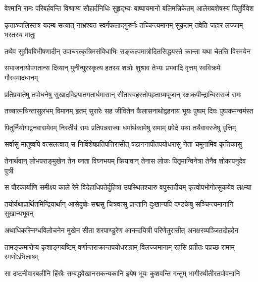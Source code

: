 \fourlineindentedshloka
{वेश्मानि रामः परिबर्हवन्ति}
{विश्राण्य सौहार्दनिधिः सुहृद्भ्यः}
{बाष्पायमानो बलिमन्निकेतम्}
{आलेख्यशेषस्य पितुर्विवेश} %

\fourlineindentedshloka
{कृताञ्जलिस्तत्र यदम्ब सत्यात्}
{नाभ्रश्यत स्वर्गफलाद्गुरुर्नः}
{तच्चिन्त्यमानम् सुकृतम् तवेति}
{जहार लज्जाम् भरतस्य मातुः} %

\fourlineindentedshloka
{तथैव सुग्रीवबिभीषणादीन्}
{उपाचरत्कृत्रिमसंविधाभिः}
{सङ्कल्पमात्रोदितसिद्धयस्ते}
{क्रान्ता यथा चेतसि विस्मयेन} %

\fourlineindentedshloka
{सभाजनायोपगतान्स दिव्यान्}
{मुनीन्पुरस्कृत्य हतस्य शत्रोः}
{शुश्राव तेभ्यः प्रभवादि वृत्तम्}
{स्वविक्रमे गौरवमादधानम्} %

\fourlineindentedshloka
{प्रतिप्रयातेषु तपोधनेषु}
{सुखादविज्ञ्यातगतार्धमासान्}
{सीतास्वहस्तोपहृताग्र्यपूजान्}
{रक्षःकपीन्द्रान्विससर्ज रामः} %

\fourlineindentedshloka
{तच्चात्मचिन्तासुलभम् विमानम्}
{हृतम् सुरारेः सह जीवितेन}
{कैलासनाथोद्वहनाय भूयः}
{पुष्पम् दिवः पुष्पकमन्वमंस्त} %

\fourlineindentedshloka
{पितुर्नियोगाद्वनवासमेवम्}
{निस्तीर्य रामः प्रतिपन्नराज्यः}
{धर्मार्थकामेषु समाम् प्रपेदे}
{यथा तथैवावरजेषु वृत्तिम्} %

\fourlineindentedshloka
{सर्वासु मातुष्वपि वत्सलत्वात्}
{स निर्विशेषप्रतिपत्तिरासीत्}
{षडाननापीतपयोधरासु}
{नेता चमूनामिव कृत्तिकासु} %

\fourlineindentedshloka
{तेनार्थवान् लोभपराङ्मुखेन}
{तेन घ्नता विघ्नभयम् क्रियावान्}
{तेनास लोकः पितृमान्विनेत्रा}
{तेनैव शोकापनुदेव पुत्री} %

\fourlineindentedshloka
{स पौरकार्याणि समीक्ष्य काले}
{रेमे विदेहाधिपतेर्दुहित्रा}
{उपस्थितश्चारु वपुस्तदीयम्}
{कृत्वोपभोगोत्सुकयेव लक्ष्म्या} %

\fourlineindentedshloka
{तयोर्यथाप्रार्थितमिन्द्रियार्थान्}
{आसेदुषोः सद्मसु चित्रवत्सु}
{प्राप्तानि दुःखान्यपि दण्डकेषु}
{सञ्चिन्त्यमानानि सुखान्यभूवन्} %

\fourlineindentedshloka
{अथाधिकस्निग्धविलोचनेन}
{मुखेन सीता शरपाण्डुरेण}
{आनन्दयित्री परिणेतुरासीत्}
{अनक्षरव्यञ्जितदोहदेन} %

\fourlineindentedshloka
{तामङ्कमारोप्य कृशाङ्गयष्टिम्}
{वर्णान्तराक्रान्तपयोधराग्राम्}
{विलज्जमानाम् रहसि प्रतीतः}
{पप्रच्छ रामाम् रमणोऽभिलाषम्} %

\fourlineindentedshloka
{सा दष्टनीवारबलीनि हिंस्रैः}
{सम्बद्धवैखानसकन्यकानि}
{इयेष भूयः कुशवन्ति गन्तुम्}
{भागीरथीतीरतपोवनानि} %

